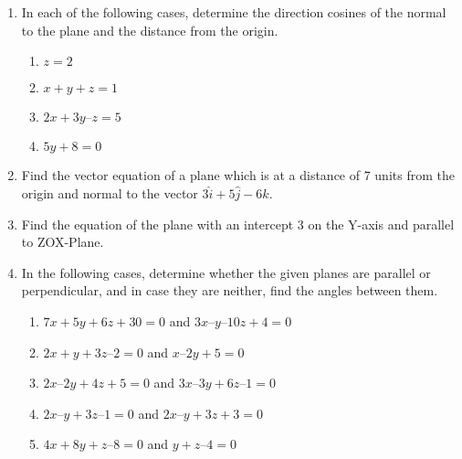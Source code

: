 \begin{enumerate}[label=\thesection.\arabic*,ref=\thesection.\theenumi]
 \item  In each of the following cases, determine the direction cosines of the normal to
the plane and the distance from the origin.
\begin{enumerate}
	\item $z=2$ 
	\item $x + y + z = 1$
	\item $2x + 3y – z = 5$
	\item $5y + 8 = 0$
\end{enumerate}
    \solution
		
\item Find the vector equation of a plane which is at a distance of 7 units from the origin and normal to the vector $3\hat{i}+5\hat{j}-6\hat{k}$.
	\\
    \solution
		
	\item Find the equation of the plane with an intercept 3 on the Y-axis and parallel to ZOX-Plane.\\
    \solution
		
\item In the following cases, determine whether the given planes are parallel or perpendicular, and in case they are neither, find the angles between them.
\begin{enumerate}
\item $7x + 5y + 6z + 30 = 0$ and $3x – y – 10z + 4 = 0$
\item $2x + y + 3z – 2 = 0$ and $x – 2y + 5 = 0$
\item $2x – 2y + 4z + 5 = 0$ and $3x – 3y + 6z – 1 = 0$
\item $2x – y + 3z – 1 = 0$ and $2x – y + 3z + 3 = 0$
\item $4x + 8y + z – 8 = 0$ and $y + z – 4 = 0$
\end{enumerate}
    \solution
		
\end{enumerate}

